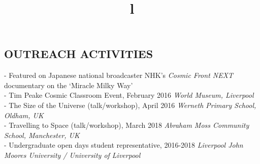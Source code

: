 \documentclass[margin]{res}
\begin{document}
\begin{resume}
\section{OUTREACH ACTIVITIES}
\par
- Featured on Japanese national broadcaster NHK's \emph{Cosmic Front NEXT} documentary on the `Miracle Milky Way'\\
- Tim Peake Cosmic Classroom Event, February 2016 \emph{World Museum, Liverpool}\\
- The Size of the Universe (talk/workshop), April 2016 \emph{Werneth Primary School, Oldham, UK}\\
- Travelling to Space (talk/workshop), March 2018 \emph{Abraham Moss Community School, Manchester, UK}\\
- Undergraduate open days student representative, 2016-2018 \emph{Liverpool John Moores University / University of Liverpool}


\begin{format}
\title{l}\\
\\
\body\\
\end{format}


\end{resume}
\end{document}
